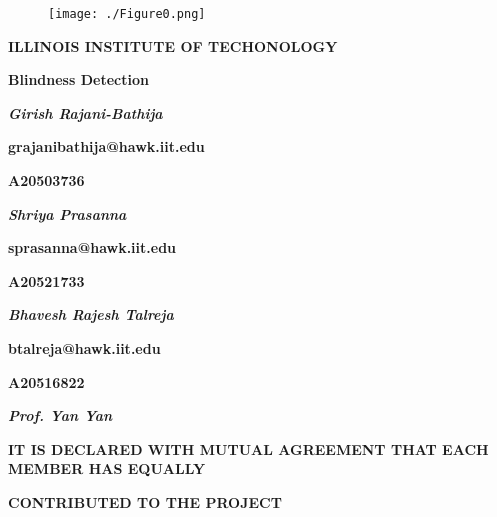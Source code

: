 \documentclass[
]{article}
\author{}
\date{}
\begin{document}
\begin{figure}[htbp]
\centerline{\texttt{[image: ./Figure0.png]}}
\label{fig}
\end{figure}

\vspace{3mm}
\centerline{\textbf{\LARGE ILLINOIS INSTITUTE OF TECHONOLOGY}\vspace{8mm}}
\centerline{\vspace{8mm}}
\centerline{\textbf{\LARGE Blindness Detection}\vspace{15mm}}
\centerline{\textbf{\textit{\large Girish Rajani-Bathija}}\vspace{4mm}}
\centerline{\textbf{\large grajanibathija@hawk.iit.edu}\vspace{4mm}}
\centerline{\textbf{\large A20503736}\vspace{15mm}}
\centerline{\textbf{\textit{\large Shriya Prasanna}}\vspace{4mm}}
\centerline{\textbf{\large sprasanna@hawk.iit.edu}\vspace{4mm}}
\centerline{\textbf{\large A20521733}\vspace{15mm}}
\centerline{\textbf{\textit{\large Bhavesh Rajesh Talreja}}\vspace{4mm}}
\centerline{\textbf{\large btalreja@hawk.iit.edu}\vspace{4mm}}
\centerline{\textbf{\large A20516822}\vspace{15mm}}
\centerline{\textbf{\textit{\large Prof. Yan Yan}}\vspace{8mm}}
\centerline{\vspace{8mm}}
\centerline{\textbf{\large IT IS DECLARED WITH MUTUAL AGREEMENT THAT EACH MEMBER HAS EQUALLY}}
\centerline{\textbf{\large CONTRIBUTED TO THE PROJECT}}
\newpage

%
%
%
%
%
%
%
%
%
%
%
%
%
%
%
%
\end{document}

